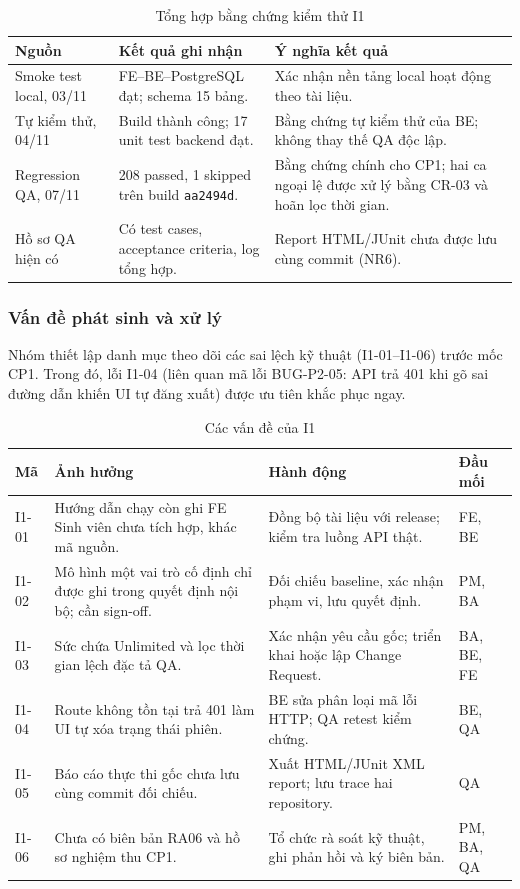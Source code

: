 \begin{table}[H]
\centering\small
\caption{Tổng hợp bằng chứng kiểm thử I1}\label{tab:i1-quality}
\begin{tabularx}{\linewidth}{@{}p{.24\linewidth}XX@{}}
\toprule
\textbf{Nguồn} & \textbf{Kết quả ghi nhận} & \textbf{Ý nghĩa kết quả}\\\midrule
Smoke test local, 03/11 & FE--BE--PostgreSQL đạt; schema 15 bảng. & Xác nhận nền tảng local hoạt động theo tài liệu.\\
Tự kiểm thử, 04/11 & Build thành công; 17 unit test backend đạt. & Bằng chứng tự kiểm thử của BE; không thay thế QA độc lập.\\
Regression QA, 07/11 & 208 passed, 1 skipped trên build \texttt{aa2494d}. & Bằng chứng chính cho CP1; hai ca ngoại lệ được xử lý bằng CR-03 và hoãn lọc thời gian.\\
Hồ sơ QA hiện có & Có test cases, acceptance criteria, log tổng hợp. & Report HTML/JUnit chưa được lưu cùng commit (NR6).\\
\bottomrule
\end{tabularx}
\end{table}

\subsubsection{Vấn đề phát sinh và xử lý}

Nhóm thiết lập danh mục theo dõi các sai lệch kỹ thuật (I1-01--I1-06) trước mốc CP1. Trong đó, lỗi I1-04 (liên quan mã lỗi BUG-P2-05: API trả 401 khi gõ sai đường dẫn khiến UI tự đăng xuất) được ưu tiên khắc phục ngay.

\begin{table}[H]
\centering\small
\caption{Các vấn đề của I1}\label{tab:i1-issues}
\begin{tabularx}{\linewidth}{@{}p{.08\linewidth}XXp{.13\linewidth}@{}}
\toprule
\textbf{Mã} & \textbf{Ảnh hưởng} & \textbf{Hành động} & \textbf{Đầu mối}\\\midrule
I1-01 & Hướng dẫn chạy còn ghi FE Sinh viên chưa tích hợp, khác mã nguồn. & Đồng bộ tài liệu với release; kiểm tra luồng API thật. & FE, BE\\
I1-02 & Mô hình một vai trò cố định chỉ được ghi trong quyết định nội bộ; cần sign-off. & Đối chiếu baseline, xác nhận phạm vi, lưu quyết định. & PM, BA\\
I1-03 & Sức chứa Unlimited và lọc thời gian lệch đặc tả QA. & Xác nhận yêu cầu gốc; triển khai hoặc lập Change Request. & BA, BE, FE\\
I1-04 & Route không tồn tại trả 401 làm UI tự xóa trạng thái phiên. & BE sửa phân loại mã lỗi HTTP; QA retest kiểm chứng. & BE, QA\\
I1-05 & Báo cáo thực thi gốc chưa lưu cùng commit đối chiếu. & Xuất HTML/JUnit XML report; lưu trace hai repository. & QA\\
I1-06 & Chưa có biên bản RA06 và hồ sơ nghiệm thu CP1. & Tổ chức rà soát kỹ thuật, ghi phản hồi và ký biên bản. & PM, BA, QA\\
\bottomrule
\end{tabularx}
\end{table}

